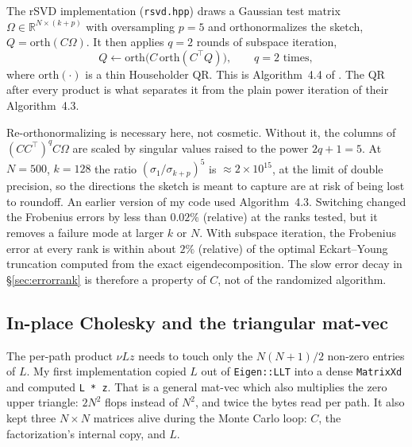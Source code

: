 The rSVD implementation (\texttt{rsvd.hpp}) draws a Gaussian test matrix
$\Omega \in \mathbb{R}^{N \times (k+p)}$ with oversampling $p = 5$ and
orthonormalizes the sketch, $Q = \mathrm{orth}(C\Omega)$.  It then applies $q = 2$
rounds of subspace iteration,
\begin{equation}
  Q \leftarrow \mathrm{orth}\bigl(C\,\mathrm{orth}(C^\top Q)\bigr),
  \qquad q = 2 \text{ times},
\end{equation}
where $\mathrm{orth}(\cdot)$ is a thin Householder QR.  This is Algorithm~4.4 of
\citet{halko2011finding}.  The QR after every product is what separates it from
the plain power iteration of their Algorithm~4.3.

Re-orthonormalizing is necessary here, not cosmetic.  Without it, the columns of
$(CC^\top)^q C\Omega$ are scaled by singular values raised to the power $2q+1 = 5$.
At $N = 500$, $k = 128$ the ratio $(\sigma_1/\sigma_{k+p})^5$ is
$\approx 2 \times 10^{15}$, at the limit of double precision, so the directions the
sketch is meant to capture are at risk of being lost to roundoff.  An earlier
version of my code used Algorithm~4.3.  Switching changed the Frobenius errors by
less than $0.02\%$ (relative) at the ranks tested, but it removes a failure mode at
larger $k$ or $N$.  With subspace iteration, the Frobenius error at every rank is
within about $2\%$ (relative) of the optimal Eckart--Young truncation computed from
the exact eigendecomposition.  The slow error decay in §\ref{sec:errorrank} is
therefore a property of $C$, not of the randomized algorithm.

\subsection{In-place Cholesky and the triangular mat-vec}
\label{sec:cholesky-impl}

The per-path product $\nu Lz$ needs to touch only the $N(N+1)/2$ non-zero entries
of $L$.  My first implementation copied $L$ out of \texttt{Eigen::LLT} into a dense
\texttt{MatrixXd} and computed \texttt{L * z}.  That is a general mat-vec which also
multiplies the zero upper triangle: $2N^2$ flops instead of $N^2$, and twice the
bytes read per path.  It also kept three $N \times N$ matrices alive during the
Monte Carlo loop: $C$, the factorization's internal copy, and $L$.

